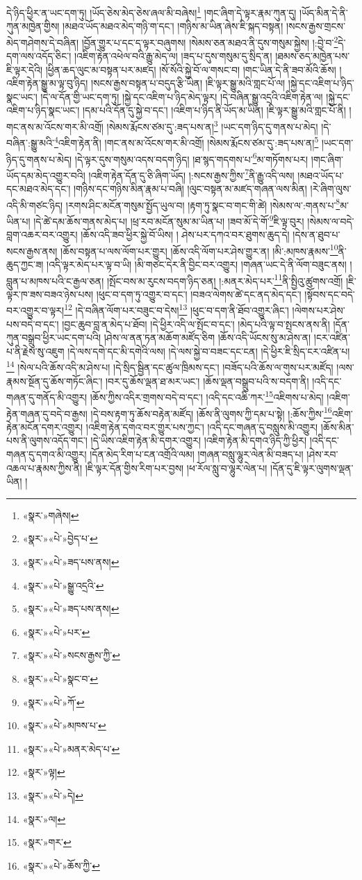 དེ་ཉིད་ཕྱིར་ན་ཡང་དག་ཏུ། །ཡོད་ཅེས་མེད་ཅེས་ཞལ་མི་བཞེས།\footnote{«སྣར་»གཞེས།} །གང་ཞིག་དེ་ལྟར་རྣམ་ཀུན་དུ། །ཡོད་མིན་དེ་ནི་ཀུན་མཁྱེན་གྱིས། །མཐའ་ཡོད་མཐའ་མེད་གཉི་ག་དང་། །གཉིས་མ་ཡིན་ཞེས་ཇི་སྐད་བསྟན། །སངས་རྒྱས་གྲངས་མེད་གཤེགས་དེ་བཞིན། །བྱོན་གྱུར་པ་དང་ད་ལྟར་བཞུགས། །སེམས་ཅན་མཐའ་ནི་དུས་གསུམ་སྐྱེས། །:བྱེ་བ་\footnote{«སྣར་»«པེ་»བྱེད་པ་}དེ་དག་ལས་འདོད་ཅིང་། །འཇིག་རྟེན་འཕེལ་བའི་རྒྱུ་མེད་ལ། །ཟད་པ་དུས་གསུམ་དུ་སྲིད་ན། །ཐམས་ཅད་མཁྱེན་པས་ཇི་ལྟར་དེའི། །ཕྱིན་ཆད་ལུང་མ་བསྟན་པར་མཛད། །སོ་སོའི་སྐྱེ་བོ་ལ་གསང་བ། །གང་ཡིན་དེ་ནི་ཟབ་མོའི་ཆོས། །འཇིག་རྟེན་སྒྱུ་མ་ལྟ་བུ་ཉིད། །སངས་རྒྱས་བསྟན་པ་བདུད་རྩི་ཡིན། །ཇི་ལྟར་སྒྱུ་མའི་གླང་པོ་ལ། །སྐྱེ་དང་འཇིག་པ་ཉིད་སྣང་ཡང་། །དེ་ལ་དོན་གྱི་ཡང་དག་ཏུ། །སྐྱེ་དང་འཇིག་པ་ཉིད་མེད་ལྟར། །དེ་བཞིན་སྒྱུ་འདྲའི་འཇིག་རྟེན་ལ། །སྐྱེ་དང་འཇིག་པ་ཉིད་སྣང་ཡང་། །དམ་པའི་དོན་དུ་སྐྱེ་བ་དང་། །འཇིག་པ་ཉིད་ནི་ཡོད་མ་ཡིན། །ཇི་ལྟར་སྒྱུ་མའི་གླང་པོ་ནི། །གང་ནས་མ་འོངས་གར་མི་འགྲོ། །སེམས་རྨོངས་ཙམ་དུ་:ཟད་པས་ན།\footnote{«སྣར་»«པེ་»ཟད་པས་ནས།} །ཡང་དག་ཉིད་དུ་གནས་པ་མེད། །དེ་བཞིན་:སྒྱུ་མའི་\footnote{«སྣར་»«པེ་»སྒྱུ་འདྲའི་}འཇིག་རྟེན་ནི། །གང་ནས་མ་འོངས་གར་མི་འགྲོ། །སེམས་རྨོངས་ཙམ་དུ་:ཟད་པས་ན།\footnote{«སྣར་»«པེ་»ཟད་པས་ནས།} །ཡང་དག་ཉིད་དུ་གནས་པ་མེད། །དེ་ལྟར་དུས་གསུམ་འདས་བདག་ཉིད། །ཐ་སྙད་གདགས་པ་\footnote{«སྣར་»«པེ་»པར་}མ་གཏོགས་པར། །གང་ཞིག་ཡོད་དམ་མེད་འགྱུར་བའི། །འཇིག་རྟེན་དོན་དུ་ཅི་ཞིག་ཡོད། །:སངས་རྒྱས་ཀྱིས་\footnote{«སྣར་»«པེ་»སངས་རྒྱས་ཀྱི་}ནི་རྒྱུ་འདི་ལས། །མཐའ་ཡོད་པ་དང་མཐའ་མེད་དང་། །གཉིས་དང་གཉིས་མིན་རྣམ་པ་བཞི། །ལུང་བསྟན་མ་མཛད་གཞན་ལས་མིན། །རེ་ཞིག་ལུས་འདི་མི་གཙང་ཉིད། །རགས་ཤིང་མངོན་གསུམ་སྤྱོད་ཡུལ་བ། །རྟག་ཏུ་སྣང་བ་གང་གི་ཚེ། །སེམས་ལ་:གནས་པ་\footnote{«སྣར་»«པེ་»སྣང་བ་}མ་ཡིན་པ། །དེ་ཚེ་དམ་ཆོས་གནས་མེད་པ། །ཕྲ་རབ་མངོན་སུམ་མ་ཡིན་པ། །ཟབ་མོ་དེ་གོ་\footnote{«སྣར་»«པེ་»ཀོ་}ཇི་ལྟ་བུར། །སེམས་ལ་བདེ་བླག་འཆར་བར་འགྱུར། །ཆོས་འདི་ཟབ་ཕྱིར་སྐྱེ་བོ་ཡིས། །
ཤེས་པར་དཀའ་བར་ཐུགས་ཆུད་དེ། །དེས་ན་ཐུབ་པ་སངས་རྒྱས་ནས། །ཆོས་བསྟན་པ་ལས་ལོག་པར་གྱུར། །ཆོས་འདི་ལོག་པར་ཤེས་གྱུར་ན། །མི་:མཁས་རྣམས་\footnote{«སྣར་»«པེ་»མཁས་པ་}ནི་ཆུད་ཀྱང་ཟ། །འདི་ལྟར་མེད་པར་ལྟ་བ་ཡི། །མི་གཙང་དེར་ནི་བྱིང་བར་འགྱུར། །གཞན་ཡང་དེ་ནི་ལོག་བཟུང་ནས། །བླུན་པ་མཁས་པའི་ང་རྒྱལ་ཅན། །སྤོང་བས་མ་རུངས་བདག་ཉིད་ཅན། །:མནར་མེད་པར་\footnote{«སྣར་»«པེ་»མནར་མེད་པ་}ནི་སྤྱིའུ་ཚུགས་འགྲོ། །ཇི་ལྟར་ཁ་ཟས་བཟའ་ཉེས་པས། །ཕུང་བ་དག་ཏུ་འགྱུར་བ་དང་། །བཟའ་ལེགས་ཚེ་དང་ནད་མེད་དང་། །སྟོབས་དང་བདེ་བར་འགྱུར་བ་ལྟར།\footnote{«སྣར་»ལྟ།} །དེ་བཞིན་ལོག་པར་བཟུང་བ་དེས།\footnote{«སྣར་»«པེ་»དེ།} །ཕུང་བ་དག་ནི་ཐོབ་འགྱུར་ཞིང་། །ལེགས་པར་ཤེས་པས་བདེ་བ་དང་། །བྱང་ཆུབ་བླ་ན་མེད་པ་ཐོབ། །དེ་ཕྱིར་འདི་ལ་སྤོང་བ་དང་། །མེད་པའི་ལྟ་བ་སྤངས་ནས་ནི། །དོན་ཀུན་བསྒྲུབ་ཕྱིར་ཡང་དག་པའི། །ཤེས་ལ་ནན་ཏན་མཆོག་མཛོད་ཅིག །ཆོས་འདི་ཡོངས་སུ་མ་ཤེས་ན། །ངར་འཛིན་པ་ནི་རྗེས་སུ་འཇུག །དེ་ལས་དགེ་དང་མི་དགེའི་ལས། །དེ་ལས་སྐྱེ་བ་བཟང་དང་ངན། །དེ་ཕྱིར་ཇི་སྲིད་ངར་འཛིན་པ།\footnote{«སྣར་»ལ།} །སེལ་པའི་ཆོས་འདི་མ་ཤེས་པ། །དེ་སྲིད་སྦྱིན་དང་ཚུལ་ཁྲིམས་དང་། །བཟོད་པའི་ཆོས་ལ་གུས་པར་མཛོད། །ལས་རྣམས་སྔོན་དུ་ཆོས་གཏོང་ཞིང་། །བར་དུ་ཆོས་ལྡན་ཐ་མར་ཡང་། །ཆོས་ལྡན་བསྒྲུབ་པའི་ས་བདག་ནི། །འདི་དང་གཞན་དུ་གནོད་མི་འགྱུར། །ཆོས་ཀྱིས་འདིར་གྲགས་བདེ་བ་དང་། །འདི་དང་འཆི་ཀར་\footnote{«སྣར་»གར་}འཇིགས་པ་མེད། །འཇིག་རྟེན་གཞན་དུ་བདེ་བ་རྒྱས། །དེ་བས་རྟག་ཏུ་ཆོས་བརྟེན་མཛོད། །ཆོས་ནི་ལུགས་ཀྱི་དམ་པ་སྟེ། །:ཆོས་ཀྱིས་\footnote{«སྣར་»«པེ་»ཆོས་ཀྱི་}འཇིག་རྟེན་མངོན་དགར་འགྱུར། །འཇིག་རྟེན་དགའ་བར་གྱུར་པས་ཀྱང་། །འདི་དང་གཞན་དུ་བསླུས་མི་འགྱུར། །ཆོས་མིན་པས་ནི་ལུགས་འདོད་གང་། །དེ་ཡིས་འཇིག་རྟེན་མི་དགར་འགྱུར། །འཇིག་རྟེན་མི་དགའ་ཉིད་ཀྱི་ཕྱིར། །འདི་དང་གཞན་དུ་དགའ་མི་འགྱུར། །དོན་མེད་རིག་པ་ངན་འགྲོའི་ལམ། །གཞན་བསླུ་ལྷུར་ལེན་མི་བཟད་པ། །ཤེས་རབ་འཆལ་པ་རྣམས་ཀྱིས་ནི། །ཇི་ལྟར་དོན་གྱིས་རིག་པར་བྱས། །ཕ་རོལ་སླུ་བ་ལྷུར་ལེན་པ། །དོན་དུ་ཇི་ལྟར་ལུགས་ལྡན་ཡིན། །
